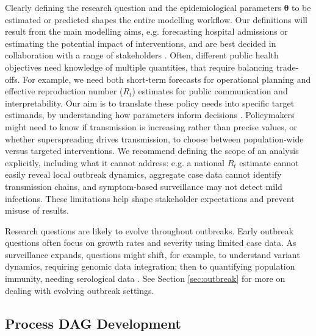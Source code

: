\documentclass{article}
\begin{document}
Clearly defining the research question and the epidemiological parameters $\boldsymbol{\theta}$ to be estimated or predicted shapes the entire modelling workflow. Our definitions will result from the main modelling aims, e.g. forecasting hospital admissions or estimating the potential impact of interventions, and are best decided in collaboration with a range of stakeholders \citep{marshall2024when}.
Often, different public health objectives need knowledge of multiple quantities, that require balancing trade-offs. For example, we need both short-term forecasts for operational planning and effective reproduction number ($R_t$) estimates for public communication and interpretability. Our aim is to translate these policy needs into specific target estimands, by understanding how parameters inform decisions \citep{nicholson2022interoperability, who-mosaic-2023}. Policymakers might need to know if transmission is increasing rather than precise values, or whether superspreading drives transmission, to choose between population-wide versus targeted interventions. We recommend defining the scope of an analysis explicitly, including what it cannot address: e.g. a national $R_t$ estimate cannot easily reveal local outbreak dynamics, aggregate case data cannot identify transmission chains, and symptom-based surveillance may not detect mild infections.
These limitations help shape stakeholder expectations and prevent misuse of results.

Research questions are likely to evolve throughout outbreaks. Early outbreak questions often focus on growth rates and severity using limited case data. As surveillance expands, questions might shift, for example, to understand variant dynamics, requiring genomic data integration; then to quantifying population immunity, needing serological data \citep{bhatia2023lessons,shearer2024opportunities}. See Section \ref{sec:outbreak} for more on dealing with evolving outbreak settings.

\subsection{Process DAG Development} \label{sec:process}
\end{document}
